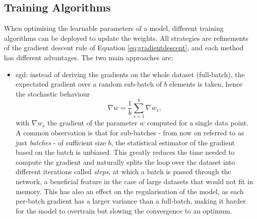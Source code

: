 \subsection{Training Algorithms}
When optimising the learnable parameters of a model, different training algorithms can be deployed to update the weights. All strategies are refinements of the gradient descent rule of Equation \ref{eq:gradientdescent}, and each method has different advantages. The two main approaches are: 
\begin{itemize}[leftmargin=*]
    \item \gls{sgd}: instead of deriving the gradients on the whole dataset (full-batch), the expectated gradient over a random sub-batch of $b$ elements is taken, hence the stochastic behaviour \[ \nabla w = \frac{1}{b} \sum_{s=1}^b \nabla w_s,\] with $\nabla w_s$ the gradient of the parameter $w$ computed for a single data point. A common observation is that for sub-batches - from now on referred to as just \textit{batches} - of sufficient size $b$, the statistical estimator of the gradient based on the batch is unbiased. This greatly reduces the time needed to compute the gradient and naturally splits the loop over the dataset into different iterations called \textit{steps}, at which a batch is passed through the network, a beneficial feature in the case of large datasets that would not fit in memory. This has also an effect on the regularisation of the model, as each per-batch gradient has a larger variance than a full-batch, making it harder for the model to overtrain but slowing the convergence to an optimum. 

\end{itemize}
